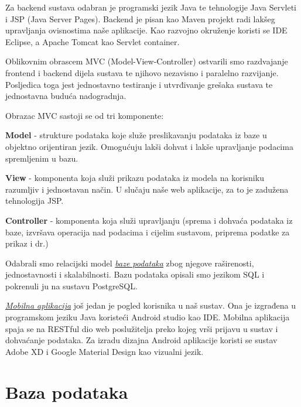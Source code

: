 	Za backend sustava odabran je programski jezik Java te tehnologije Java Servleti i JSP (Java Server Pages). Backend je pisan kao Maven projekt radi lakšeg upravljanja ovisnostima naše aplikacije. Kao razvojno okruženje koristi se IDE Eclipse, a Apache Tomcat kao Servlet container.
	
	Oblikovnim obrascem MVC (Model-View-Controller) ostvarili smo razdvajanje frontend i backend dijela sustava te njihovo nezavisno i paralelno razvijanje. Posljedica toga jest jednostavno testiranje i utvrđivanje grešaka sustava te jednostavna buduća nadogradnja.
	
	Obrazac MVC sastoji se od tri komponente:
	\begin{packed_item}
		
		\item \textbf{Model} - strukture podataka koje služe preslikavanju podataka iz baze u objektno orijentiran jezik. Omogućuju lakši dohvat i lakše upravljanje podacima spremljenim u bazu.
		\item \textbf{View} - komponenta koja služi prikazu podataka iz modela na korisniku razumljiv i jednostavan način. U slučaju naše web aplikacije, za to je zadužena tehnologija JSP.
		\item \textbf{Controller} - komponenta koja služi upravljanju (sprema i dohvaća podataka iz baze, izvršava operacija nad podacima i cijelim sustavom, priprema podatke za prikaz i dr.)
		
	\end{packed_item}
	
	Odabrali smo relacijski model \textit{\underline{baze podataka}} zbog njegove raširenosti, jednostavnosti i skalabilnosti. Bazu podataka opisali smo jezikom SQL i pokrenuli ju na sustavu PostgreSQL.

	\textit{\underline{Mobilna aplikacija}} još jedan je pogled korisnika u naš sustav. Ona je izgrađena u programskom jeziku Java koristeći Android studio kao IDE. Mobilna aplikacija spaja se na RESTful dio web poslužitelja preko kojeg vrši prijavu u sustav i dohvaćanje podataka. Za izradu dizajna Android aplikacije koristi se sustav Adobe XD i Google Material Design kao vizualni jezik.
		
		\eject
				
		\section{Baza podataka}
			
